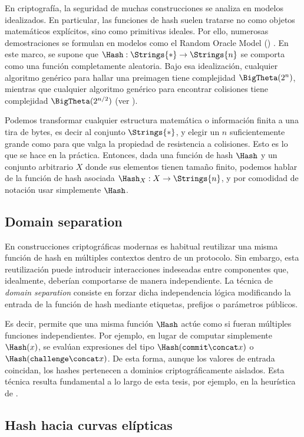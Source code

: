 En criptografía, la seguridad de muchas construcciones se analiza en modelos idealizados. En particular, las funciones de hash suelen tratarse no como objetos matemáticos explícitos, sino como primitivas ideales. Por ello, numerosas demostraciones se formulan en modelos como el Random Oracle Model (\ROM) \cite{Bellare1993}. En este marco, se supone que $\Hash: \Strings{*} \to \Strings{n}$ se comporta como una función completamente aleatoria. Bajo esa idealización, cualquier algoritmo genérico para hallar una preimagen tiene complejidad $\BigTheta(2^n)$, mientras que cualquier algoritmo genérico para encontrar colisiones tiene complejidad $\BigTheta(2^{n/2})$ (ver \cite{hac}).

Podemos transformar cualquier estructura matemática o información finita a una tira de bytes, es decir al conjunto $\Strings{*}$, y elegir un $n$ suficientemente grande como para que valga la propiedad de resistencia a colisiones. Esto es lo que se hace en la práctica. Entonces, dada una función de hash $\Hash$ y un conjunto arbitrario $X$ donde sus elementos tienen tamaño finito, podemos hablar de la función de hash asociada $\Hash_X: X \to \Strings{n}$, y por comodidad de notación usar simplemente $\Hash$.

\subsection{Domain separation}

En construcciones criptográficas modernas es habitual reutilizar una misma función de hash en múltiples contextos dentro de un protocolo. Sin embargo, esta reutilización puede introducir interacciones indeseadas entre componentes que, idealmente, deberían comportarse de manera independiente. La técnica de \textit{domain separation} consiste en forzar dicha independencia lógica modificando la entrada de la función de hash mediante etiquetas, prefijos o parámetros públicos.

Es decir, permite que una misma función $\Hash$ actúe como si fueran múltiples funciones independientes. Por ejemplo, en lugar de computar simplemente $\Hash(x)$, se evalúan expresiones del tipo $\Hash(\texttt{commit} \concat x)$ o $\Hash(\texttt{challenge} \concat x)$. De esta forma, aunque los valores de entrada coincidan, los hashes pertenecen a dominios criptográficamente aislados. Esta técnica resulta fundamental a lo largo de esta tesis, por ejemplo, en la heurística de \FiatShamir.

\subsection{Hash hacia curvas elípticas}

